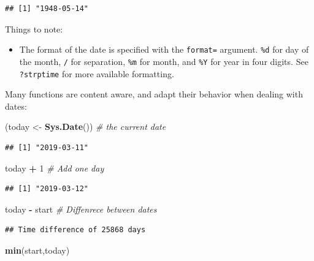 \documentclass[]{book}
\newenvironment{Shaded}{\begin{snugshade}}{\end{snugshade}}
\newcommand{\KeywordTok}[1]{\textcolor[rgb]{0.13,0.29,0.53}{\textbf{#1}}}
\newcommand{\DecValTok}[1]{\textcolor[rgb]{0.00,0.00,0.81}{#1}}
\newcommand{\StringTok}[1]{\textcolor[rgb]{0.31,0.60,0.02}{#1}}
\newcommand{\CommentTok}[1]{\textcolor[rgb]{0.56,0.35,0.01}{\textit{#1}}}
\newcommand{\OperatorTok}[1]{\textcolor[rgb]{0.81,0.36,0.00}{\textbf{#1}}}
\newcommand{\NormalTok}[1]{#1}
\providecommand{\tightlist}{%
  \setlength{\itemsep}{0pt}\setlength{\parskip}{0pt}}
\theoremstyle{definition}
\theoremstyle{definition}
\theoremstyle{definition}
\theoremstyle{remark}
\begin{document}
\begin{verbatim}
## [1] "1948-05-14"
\end{verbatim}

Things to note:

\begin{itemize}
\tightlist
\item
  The format of the date is specified with the \texttt{format=}
  argument. \texttt{\%d} for day of the month, \texttt{/} for
  separation, \texttt{\%m} for month, and \texttt{\%Y} for year in four
  digits. See \texttt{?strptime} for more available formatting.
\end{itemize}

Many functions are content aware, and adapt their behavior when dealing
with dates:

\begin{Shaded}
\begin{Highlighting}[]
\NormalTok{(today <-}\StringTok{ }\KeywordTok{Sys.Date}\NormalTok{()) }\CommentTok{# the current date}
\end{Highlighting}
\end{Shaded}

\begin{verbatim}
## [1] "2019-03-11"
\end{verbatim}

\begin{Shaded}
\begin{Highlighting}[]
\NormalTok{today }\OperatorTok{+}\StringTok{ }\DecValTok{1} \CommentTok{# Add one day}
\end{Highlighting}
\end{Shaded}

\begin{verbatim}
## [1] "2019-03-12"
\end{verbatim}

\begin{Shaded}
\begin{Highlighting}[]
\NormalTok{today }\OperatorTok{-}\StringTok{ }\NormalTok{start }\CommentTok{# Diffenrece between dates}
\end{Highlighting}
\end{Shaded}

\begin{verbatim}
## Time difference of 25868 days
\end{verbatim}

\begin{Shaded}
\begin{Highlighting}[]
\KeywordTok{min}\NormalTok{(start,today)}
\end{Highlighting}
\end{Shaded}
\end{document}

